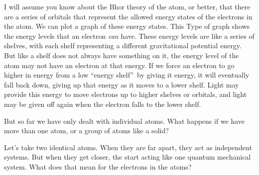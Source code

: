 I will assume you know about the Bhor theory of the atom, or better, that
there are a series of orbitals that represent the allowed energy states of
the electrons in the atom. We can plot a graph of these energy states.%
This Type of graph shows the energy levels that an electron \emph{can} have.
These energy levels are like a series of shelves, with each shelf
representing a different gravitational potential energy. But like a shelf
does not always have something on it, the energy level of the atom may not
have an electron at that energy. If we force an electron to go higher in
energy from a low \textquotedblleft energy shelf\textquotedblright\ by
giving it energy, it will eventually fall back down, giving up that energy
as it moves to a lower shelf. Light may provide this energy to move
electrons up to higher shelves or orbitals, and light may be given off again
when the electron falls to the lower shelf.\newline

But so far we have only dealt with individual atoms. What happens if we have
more than one atom, or a group of atoms like a solid?

Let's take two identical atoms. When they are far apart, they act as
independent systems. But when they get closer, the start acting like one
quantum mechanical system. What does that mean for the electrons in the
atoms?


